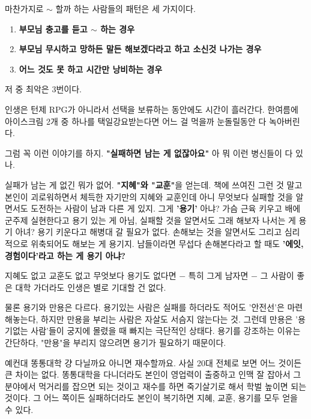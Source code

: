마찬가지로 $\sim$ 할까 하는 사람들의 패턴은 세 가지이다.
\vspace{5mm}
\begin{enumerate}
    \item \textbf{부모님 충고를 듣고 $\sim$ 하는 경우}
    \item \textbf{부모님 무시하고 망하든 말든 해보겠다라고 하고 소신것 나가는 경우}
    \item \textbf{어느 것도 못 하고 시간만 낭비하는 경우}
\end{enumerate}
\vspace{5mm}

저 중 최악은 3번이다.
\vspace{5mm}

인생은 턴제 RPG가 아니라서 선택을 보류하는 동안에도 시간이 흘러간다.
한여름에 아이스크림 2개 중 하나를 택일강요받는다면 어느 걸 먹을까 눈돌릴동안 다 녹아버린다.
\vspace{5mm}

그럼 꼭 이런 이야기를 하지. \textbf{"실패하면 남는 게 없잖아요"}
아 뭐 이런 병신들이 다 있나.
\vspace{5mm}

실패가 남는 게 없긴 뭐가 없어. \textbf{"지혜"와 "교훈"}을 얻는데.
책에 쓰여진 그런 것 말고 본인이 괴로워하면서 체득한 자기만의 지혜와 교훈인데
아니 무엇보다 실패할 것을 알면서도 도전하는 사람이 남과 다른 게 있지. 그게 \textbf{'용기'} 아냐?
가슴 근육 키우고 배에 군주제 실현한다고 용기 있는 게 아님, 실패할 것을 알면서도 그래 해보자 나서는 게 용기 아녀?
용기 키운다고 해병대 갈 필요가 없다. 손해보는 것을 알면서도 그리고 심리적으로 위축되어도 해보는 게 용기지.
남들이라면 무섭다 손해본다라고 할 때도 \textbf{'에잇, 경험이다'라고 하는 게 용기 아냐?}
\vspace{5mm}

지혜도 없고 교훈도 없고 무엇보다 용기도 없다면 $-$ 특히 그게 남자면 $-$
그 사람이 좋은 대학 가더라도 인생은 별로 기대할 건 없다.
\vspace{5mm}

물론 용기와 만용은 다르다.
용기있는 사람은 실패를 하더라도 적어도 '안전선'은 마련해놓는다, 하지만 만용을 부리는 사람은 자살도 서슴지 않는다는 것.
그런데 만용은 '용기없는 사람'들이 궁지에 몰렸을 때 빠지는 극단적인 상태다.
용기를 강조하는 이유는 간단하다, "만용"을 부리지 않으려면 용기가 필요하기 때문이다.
\vspace{5mm}

예컨대 똥통대학 걍 다닐까요 아니면 재수할까요.
사실 20대 전체로 보면 어느 것이든 큰 차이는 없다.
똥통대학을 다니더라도 본인이 영업력이 출중하고 인맥 잘 잡아서 그 분야에서 먹거리를 잡으면 되는 것이고
재수를 하면 죽기살기로 해서 학벌 높이면 되는 것이다.
그 어느 쪽이든 실패하더라도 본인이 복기하면 지혜, 교훈, 용기를 모두 얻을 수 있다.
\vspace{5mm}

